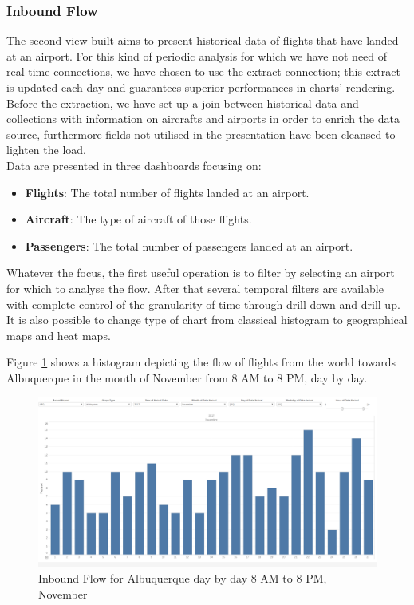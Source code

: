 \subsubsection{Inbound Flow}

The second view built aims to present historical data of flights that have landed at an airport. For this kind of periodic analysis for which we have not need of real time connections, we have chosen to use the extract connection; this extract is updated each day and guarantees superior performances in charts' rendering.
\\
Before the extraction, we have set up a join between historical data and collections with information on aircrafts and airports in order to enrich the data source, furthermore fields not utilised in the presentation have been cleansed to lighten the load.
\\
Data are presented in three dashboards focusing on:

\begin{itemize}
	\item \textbf{Flights}: The total number of flights landed at an airport.
	\item \textbf{Aircraft}: The type of aircraft of those flights.
	\item \textbf{Passengers}: The total number of passengers landed at an airport.
\end{itemize}

Whatever the focus, the first useful operation is to filter by selecting an airport for which to analyse the flow. After that several temporal filters are available with complete control of the granularity of time through drill-down and drill-up. It is also possible to change type of chart from classical histogram to geographical maps and heat maps.

Figure \ref{fig:FlightsViz} shows a histogram depicting the flow of flights from the world towards Albuquerque in the month of November from 8 AM to 8 PM, day by day.

\begin{figure}[h]
	\centering
	\includegraphics[width=0.9\linewidth]{Figures/FlightsViz.png}
	\caption{Inbound Flow for Albuquerque day by day 8 AM to 8 PM, November}
	\label{fig:FlightsViz}
\end{figure}

